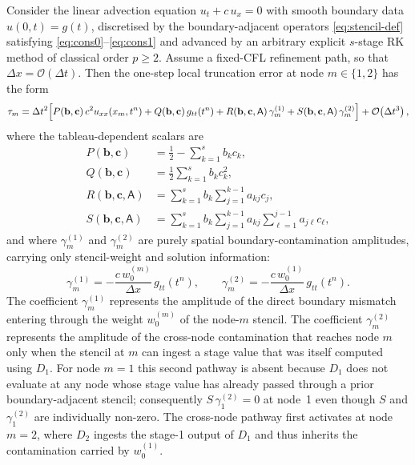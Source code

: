 \documentclass[review,hidelinks,onefignum,onetabnum]{siamart251216}
\newcommand{\Dt}{\Delta t}
\newcommand{\Dx}{\Delta x}
\newcommand{\Order}[1]{\mathcal{O}\!\left(#1\right)}
\begin{document}
\begin{theorem}
\label{thm:general}
Consider the linear advection equation $u_t+c\,u_x=0$ with smooth boundary data $u(0,t)=g(t)$, discretised by the boundary-adjacent operators \eqref{eq:stencil-def} satisfying \eqref{eq:cons0}--\eqref{eq:cons1} and advanced by an arbitrary explicit $s$-stage RK method of classical order $p\ge 2$. Assume a fixed-CFL refinement path, so that $\Dx=\Order{\Dt}$. Then the one-step local truncation error at node $m\in\{1,2\}$ has the form
\begin{equation}
  \tau_m
  = \Dt^2\Bigl[
      P(\mathbf b,\mathbf c)\,c^2u_{xx}(x_m,t^n)
      + Q(\mathbf b,\mathbf c)\,g_{tt}(t^n)
      + R(\mathbf b,\mathbf c,\mathsf A)\,\gamma_m^{(1)}
      + S(\mathbf b,\mathbf c,\mathsf A)\,\gamma_m^{(2)}
    \Bigr]
    + \Order{\Dt^3},
  \label{eq:tau-general}
\end{equation}
where the tableau-dependent scalars are
\begin{align}
  P(\mathbf b,\mathbf c)
    &= \frac{1}{2}-\sum_{k=1}^{s} b_k c_k,
  \label{eq:coeff-P}\\
  Q(\mathbf b,\mathbf c)
    &= \frac{1}{2}\sum_{k=1}^{s} b_k c_k^2,
  \label{eq:coeff-Q}\\
  R(\mathbf b,\mathbf c,\mathsf A)
    &= \sum_{k=1}^{s} b_k \sum_{j=1}^{k-1} a_{kj}c_j,
  \label{eq:coeff-R}\\
  S(\mathbf b,\mathbf c,\mathsf A)
    &= \sum_{k=1}^{s} b_k \sum_{j=1}^{k-1} a_{kj}\sum_{\ell=1}^{j-1} a_{j\ell}c_\ell,
  \label{eq:coeff-S}
\end{align}
and where $\gamma_m^{(1)}$ and $\gamma_m^{(2)}$ are purely spatial boundary-contamination amplitudes, carrying only stencil-weight and solution information:
\begin{equation}
  \gamma_m^{(1)} = -\frac{c\,w_0^{(m)}}{\Dx}\,g_{tt}(t^n),
  \qquad
  \gamma_m^{(2)} = -\frac{c\,w_0^{(1)}}{\Dx}\,g_{tt}(t^n).
  \label{eq:gamma-def}
\end{equation}
The coefficient $\gamma_m^{(1)}$ represents the amplitude of the direct boundary mismatch entering through the weight $w_0^{(m)}$ of the node-$m$ stencil. The coefficient $\gamma_m^{(2)}$ represents the amplitude of the cross-node contamination that reaches node $m$ only when the stencil at $m$ can ingest a stage value that was itself computed using $D_1$. For node $m=1$ this second pathway is absent because $D_1$ does not evaluate at any node whose stage value has already passed through a prior boundary-adjacent stencil; consequently $S\,\gamma_1^{(2)}=0$ at node~1 even though $S$ and $\gamma_1^{(2)}$ are individually non-zero. The cross-node pathway first activates at node $m=2$, where $D_2$ ingests the stage-1 output of $D_1$ and thus inherits the contamination carried by $w_0^{(1)}$.
\end{theorem}
\end{document}
